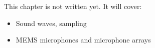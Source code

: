 \label{ch:hw4}
\begin{keyidea}
This chapter is not written yet. It will cover:
\begin{itemize}[nosep]
  \item Sound waves, sampling
  \item MEMS microphones and microphone arrays
\end{itemize}
\end{keyidea}
